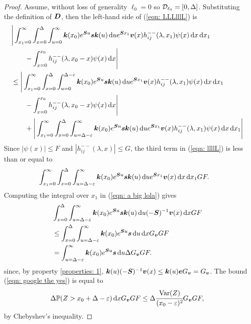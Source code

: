 \begin{proof}
	Assume, without loss of generality \(\ell_0=0\) so \(\mathcal{D}_{\ell_0}=[0,\Delta]\). Substituting the definition of \(\boldsymbol D\), then the left-hand side of (\ref{eqn: LLLlllL}) is
	\begin{align}
		&\Bigg|\int_{x_1=0}^\infty \int_{x=0}^{\Delta}\int_{u=0}^\infty \boldsymbol k(x_0)e^{\boldsymbol Su}\boldsymbol s \boldsymbol k(u) \, \mathrm{d} u e^{\boldsymbol S x_1} {\boldsymbol v}(x) h_{ij}^{--}(\lambda, x_1) \psi(x) \, \mathrm{d} x \, \mathrm{d} x_1\nonumber
		\\&{}\qquad {} - \int_{x=0}^{x_0} h_{ij}^{--}(\lambda, x_0 - x)\psi(x)\, \mathrm{d} x\Bigg| \nonumber
		\\&\leq \Bigg|\int_{x_1=0}^\infty \int_{x=0}^{\Delta}\int_{u=0}^{\Delta-\varepsilon} \boldsymbol k(x_0)e^{\boldsymbol Su}\boldsymbol s \boldsymbol k(u) \, \mathrm{d} u e^{\boldsymbol S x_1} {\boldsymbol v}(x) h_{ij}^{--}(\lambda, x_1) \psi(x) \, \mathrm{d} x \, \mathrm{d} x_1\nonumber
		\\&{}\qquad {} - \int_{x=0}^{x_0} h_{ij}^{--}(\lambda, x_0 - x)\psi(x)\, \mathrm{d} x\Bigg| \nonumber
		\\&\qquad {}+\Bigg|\int_{x_1=0}^\infty \int_{x=0}^{\Delta}\int_{u= \Delta-\varepsilon}^\infty  \boldsymbol k(x_0)e^{\boldsymbol Su}\boldsymbol s \boldsymbol k(u) \, \mathrm{d} u e^{\boldsymbol S x_1} {\boldsymbol v}(x) h_{ij}^{--}(\lambda, x_1) \psi(x) \, \mathrm{d} x \, \mathrm{d} x_1\Bigg| \label{eqn: llllL}
	\end{align}
	Since \(|\psi(x)|\leq F\) and \(|h_{ij}^{--}(\lambda,x)|\leq G\), the third term in (\ref{eqn: llllL}) is less than or equal to 
	\begin{align}
		&\int_{x_1=0}^\infty \int_{x=0}^{\Delta}\int_{u= \Delta-\varepsilon}^\infty  \boldsymbol k(x_0)e^{\boldsymbol Su}\boldsymbol s \boldsymbol k(u) \, \mathrm{d} u e^{\boldsymbol S x_1} {\boldsymbol v}(x) \, \mathrm{d} x \, \mathrm{d} x_1G F.\label{eqn: a big lola}
	\end{align} 
	Computing the integral over \(x_1\) in (\ref{eqn: a big lola}) gives
	\begin{align}
		& \int_{x=0}^{\Delta}\int_{u= \Delta-\varepsilon}^\infty  \boldsymbol k(x_0)e^{\boldsymbol Su}\boldsymbol s \boldsymbol k(u) \, \mathrm{d} u (-\boldsymbol S)^{-1}{\boldsymbol v}(x) \, \mathrm{d} x G F\nonumber
		\\&\leq  \int_{x=0}^{\Delta}\int_{u= \Delta-\varepsilon}^\infty  \boldsymbol k(x_0)e^{\boldsymbol Su}\boldsymbol s \, \mathrm{d} u \, \mathrm{d} x G_{\boldsymbol v} G F \nonumber
		\\&= \int_{u= \Delta-\varepsilon}^\infty  \boldsymbol k(x_0)e^{\boldsymbol Su}\boldsymbol s  \, \mathrm{d} u\Delta G_{\boldsymbol v} G F.\label{eqn: google the yes}
	\end{align}
	since, by property \ref{properties: 1}, \(\boldsymbol k(u)(-\boldsymbol S)^{-1}{\boldsymbol v}(x)\leq \boldsymbol k(u)\boldsymbol e G_{\boldsymbol v}=G_{\boldsymbol v}\). The bound (\ref{eqn: google the yes}) is equal to 
	\begin{align}
		\Delta \mathbb P(Z>x_0 + \Delta-\varepsilon) \, \mathrm{d} x G_{\boldsymbol v} G F
		\leq  \Delta \cfrac{\mathrm{Var}(Z)}{(x_0-\varepsilon)^2} G_{\boldsymbol v} G F, \label{eqn: JjJ}
	\end{align}
	by Chebyshev's inequality. 
	

\end{proof}
